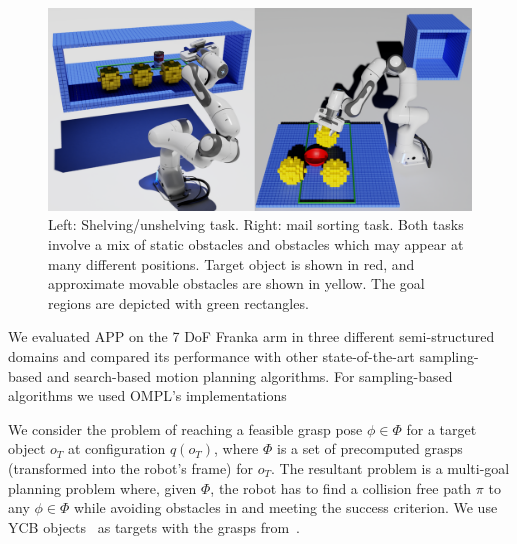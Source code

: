 \documentclass[a4paper]{report}
\begin{document}
\begin{figure}
\centering
 \includegraphics[width=\textwidth]{figs/app_fig3_v2_lo-res.png}
\caption{Left: Shelving/unshelving task. Right: mail sorting task. Both tasks involve a mix of static obstacles and obstacles which may appear at many different positions. Target object is shown in red, and approximate movable obstacles are shown in yellow. The goal regions are depicted with green rectangles.}
\label{fig:scenarios}
\end{figure}

We evaluated APP on the 7 DoF Franka arm in three different semi-structured domains and compared its performance with other state-of-the-art sampling-based and search-based motion planning algorithms. For sampling-based algorithms we used OMPL's implementations~\cite{sucan2012open}

We consider the problem of reaching a feasible grasp pose $\phi \in \Phi$ for a target object $o_T$ at configuration $q(o_T)$, where $\Phi$ is a set of precomputed grasps (transformed into the robot's frame) for $o_T$. The resultant problem is a multi-goal planning problem where, given $\Phi$, the robot has to find a collision free path $\pi$ to any $\phi \in \Phi$ while avoiding obstacles in \calW and meeting the success criterion. We use YCB objects~\cite{calli2015ycb} as targets with the grasps from~\cite{eppner2019billion}.
\end{document}
